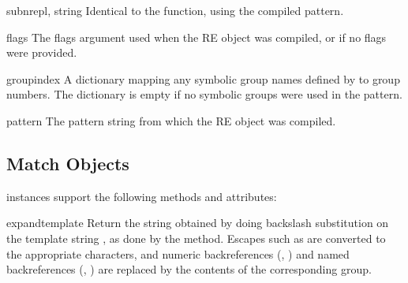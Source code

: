 \begin{methoddesc}[RegexObject]{subn}{repl, string}
Identical to the  function, using the compiled pattern.
\end{methoddesc}


\begin{memberdesc}[RegexObject]{flags}
The flags argument used when the RE object was compiled, or
 if no flags were provided.
\end{memberdesc}

\begin{memberdesc}[RegexObject]{groupindex}
A dictionary mapping any symbolic group names defined by
 to group numbers.  The dictionary is empty if no
symbolic groups were used in the pattern.
\end{memberdesc}

\begin{memberdesc}[RegexObject]{pattern}
The pattern string from which the RE object was compiled.
\end{memberdesc}


\subsection{Match Objects \label{match-objects}}

 instances support the following methods and
attributes:

\begin{methoddesc}[MatchObject]{expand}{template}
 Return the string obtained by doing backslash substitution on the
template string , as done by the  method.
Escapes such as  are converted to the appropriate
characters, and numeric backreferences (, ) and
named backreferences (, ) are replaced
by the contents of the corresponding group.
\end{methoddesc}


